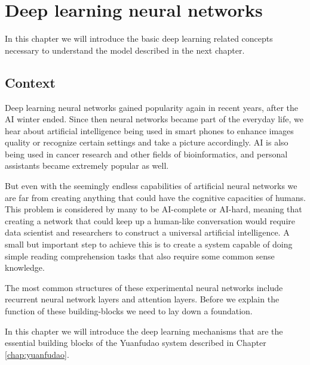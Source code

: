 \chapter{Deep learning neural networks}
\label{chap:deep}

In this chapter we will introduce the basic deep learning related concepts necessary to understand the model described in the next chapter.

\section{Context}
Deep learning neural networks gained popularity again in recent years, after the AI winter ended. Since then neural networks became part of the everyday life, we hear about artificial intelligence being used in smart phones to enhance images quality or recognize certain settings and take a picture accordingly. AI is also being used in cancer research and other fields of bioinformatics, and personal assistants became extremely popular as well.

But even with the seemingly endless capabilities of artificial neural networks we are far from creating anything that could have the cognitive capacities of humans. This problem is considered by many to be AI-complete or AI-hard, meaning that creating a network that could keep up a human-like conversation would require data scientist and researchers to construct a universal artificial intelligence. A small but important step to achieve this is to create a system capable of doing simple reading comprehension tasks that also require some common sense knowledge.

The most common structures of these experimental neural networks include recurrent neural network layers and attention layers. Before we explain the function of these building-blocks we need to lay down a foundation.

In this chapter we will introduce the deep learning mechanisms that are the essential building blocks of the Yuanfudao system described in Chapter \ref{chap:yuanfudao}.

